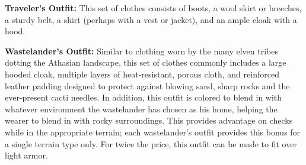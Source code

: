 \textbf{Traveler's Outfit:} This set of clothes consists of boots, a wool skirt or breeches, a sturdy belt, a shirt (perhaps with a vest or jacket), and an ample cloak with a hood.

\textbf{Wastelander's Outfit:} Similar to clothing worn by the many elven tribes dotting the Athasian landscape, this set of clothes commonly includes a large hooded cloak, multiple layers of heat-resistant, porous cloth, and reinforced leather padding designed to protect against blowing sand, sharp rocks and the ever-present cacti needles. In addition, this outfit is colored to blend in with whatever environment the wastelander has chosen as his home, helping the wearer to blend in with rocky surroundings. This provides advantage on  checks while in the appropriate terrain; each wastelander's outfit provides this bonus for a single terrain type only. For twice the price, this outfit can be made to fit over light armor.